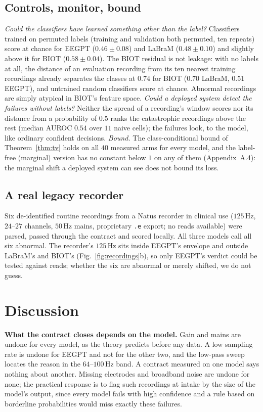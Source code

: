 \documentclass[conference]{IEEEtran}
\newcommand{\PINSKERNUMBERS}{The class-conditional bound of Theorem~\ref{thm:tv} holds on all $40$ measured arms for every model, and the label-free (marginal) version has no constant below $1$ on any of them (Appendix~A.4): the marginal shift a deployed system can see does not bound its loss.}
\begin{document}
\subsection{Controls, monitor, bound}
\label{sec:controls}
\textit{Could the classifiers have learned something other than the
label?} Classifiers trained on permuted labels (training and
validation both permuted, ten repeats) score at chance for EEGPT
($0.46 \pm 0.08$) and LaBraM ($0.48 \pm 0.10$) and slightly above it
for BIOT ($0.58 \pm 0.04$). The BIOT residual is not leakage: with no
labels at all, the distance of an evaluation recording from its ten
nearest training recordings already separates the classes at $0.74$
for BIOT ($0.70$ LaBraM, $0.51$ EEGPT), and untrained random
classifiers score at chance. Abnormal recordings are simply atypical
in BIOT's feature space. \textit{Could a deployed system detect the
failures without labels?} Neither the spread of a recording's window
scores nor its distance from a probability of $0.5$ ranks the
catastrophic recordings above the rest (median AUROC $0.54$ over $11$
naive cells); the failures look, to the model, like ordinary
confident decisions. \textit{Bound.} \PINSKERNUMBERS

\subsection{A real legacy recorder}
\label{sec:legacy}
Six de-identified routine recordings from a Natus recorder in clinical
use ($125$\,Hz, $24$--$27$ channels, $50$\,Hz mains, proprietary
\texttt{.e} export; no reads available) were parsed, passed through
the contract and scored locally. All three models call all six
abnormal. The recorder's $125$\,Hz sits inside EEGPT's envelope and
outside LaBraM's and BIOT's (Fig.~\ref{fig:recordings}b), so only
EEGPT's verdict could be tested against reads; whether the six are
abnormal or merely shifted, we do not guess.

\section{Discussion}
\label{sec:discussion}
\textbf{What the contract closes depends on the model.} Gain and
mains are undone for every model, as the theory predicts before any
data. A low sampling rate is undone for EEGPT and not for the other
two, and the low-pass sweep locates the reason in the $64$--$100$\,Hz
band. A contract measured on one model says nothing about another.
Missing electrodes and broadband noise are undone for none; the
practical response is to flag such recordings at intake by the size
of the model's output, since every model fails with high confidence
and a rule based on borderline probabilities would miss exactly these
failures.
\end{document}
